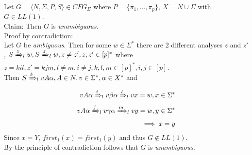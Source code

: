 Let $G = \langle N, \Sigma , P, S \rangle \in CFG_\Sigma$ where $P = \{\pi_1, \dots ,  \pi_p \}$, $X = N \cup \Sigma$ with $G \in LL(1)$.\\
Claim: Then $G$ is \emph{unambiguous}.\\[1ex]
Proof by contradiction:\\
Let $G$ be \emph{ambiguous}. Then for some $w \in \Sigma^{*}$ there are 2 different analyses $z$ and $z'$, $S \xRightarrow{z}{}_{\hspace{-3pt} l}\; w, S \xRightarrow{z}{}_{\hspace{-3pt} l}\; w, z \neq z', z, z' \in [p]^{*}$ where $z = kil, z' = kjm, l \neq m, i \neq j, k, l, m \in [p]^{*}, i, j \in [p]$.\\
Then $S \xRightarrow{k}{}_{\hspace{-3pt} l}\; vA\alpha , A \in N, v \in \Sigma^{*}, \alpha \in X^{*}$ and\\
\begin{equation*}\begin{split}
vA\alpha \xRightarrow{i}{}_{\hspace{-3pt} l}\; v\beta\alpha \xRightarrow{l}{}_{\hspace{-3pt} l}\; vx = w, x \in \Sigma^{*}\\
vA\alpha \xRightarrow{j}{}_{\hspace{-3pt} l}\; v\gamma\alpha \xRightarrow{m}{}_{\hspace{-3pt} l}\; vy = w, y \in \Sigma^{*}\\
\implies x = y
\end{split}\end{equation*}
Since $x = Y$, $first_1(x) = first_1(y)$ and thus $G \not\in LL(1)$. \Lightning\\[1ex]
By the principle of contradiction follows that $G$ is \emph{unambiguous}.